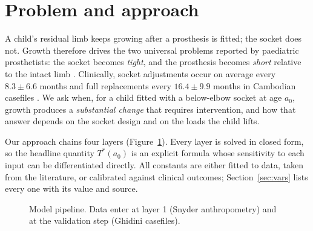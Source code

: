 \documentclass[11pt]{article}
\newcommand{\eps}{\varepsilon}
\newcommand{\lift}{u_{\mathrm{lift}}}
\newcommand{\lfa}{\ell_{\mathrm{fa}}}
\newcommand{\Fax}{F_{\mathrm{ax}}}
\theoremstyle{definition}
\begin{document}
\tableofcontents

\section{Problem and approach}
\label{sec:intro}
A child's residual limb keeps growing after a prosthesis is fitted; the socket does not. Growth therefore drives the two universal problems reported by paediatric prosthetists: the socket becomes \emph{tight}, and the prosthesis becomes \emph{short} relative to the intact limb \cite{ghidini2025}. Clinically, socket adjustments occur on average every $8.3\pm6.6$ months and full replacements every $16.4\pm9.9$ months in Cambodian casefiles \cite{ghidini2025}. We ask when, for a child fitted with a below-elbow socket at age $a_0$, growth produces a \emph{substantial change} that requires intervention, and how that answer depends on the socket design and on the loads the child lifts.

Our approach chains four layers (Figure~\ref{fig:pipeline}). Every layer is solved in closed form, so the headline quantity $T^*(a_0)$ is an explicit formula whose sensitivity to each input can be differentiated directly. All constants are either fitted to data, taken from the literature, or calibrated against clinical outcomes; Section~\ref{sec:vars} lists every one with its value and source.

\begin{figure}[htbp]
\centering
{}
\caption{Model pipeline. Data enter at layer 1 (Snyder anthropometry) and at the validation step (Ghidini casefiles).}
\label{fig:pipeline}
\end{figure}
\end{document}
